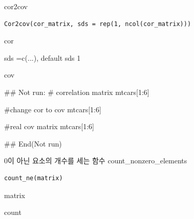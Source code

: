 \documentclass[a4paper]{book}
\begin{document}
%
\begin{Description}
cor2cov
\end{Description}
%
\begin{Usage}
\begin{verbatim}
Cor2cov(cor_matrix, sds = rep(1, ncol(cor_matrix)))
\end{verbatim}
\end{Usage}
%
\begin{Arguments}
\begin{ldescription}
\item[\code{cor\_matrix}] cor

\item[\code{sds}] sds =c(...), default sds 1
\end{ldescription}
\end{Arguments}
%
\begin{Value}
cov
\end{Value}
%
\begin{Examples}
\begin{ExampleCode}

## Not run: 
# correlation matrix
mtcars[1:6] %

#change cor to cov
mtcars[1:6] %

#real cov matrix
mtcars[1:6] %


## End(Not run)


\end{ExampleCode}
\end{Examples}
%
\begin{Description}
0이 아닌 요소의 개수를 세는 함수 count\_nonzero\_elements
\end{Description}
%
\begin{Usage}
\begin{verbatim}
count_ne(matrix)
\end{verbatim}
\end{Usage}
%
\begin{Arguments}
\begin{ldescription}
\item[\code{matrix}] matrix
\end{ldescription}
\end{Arguments}
%
\begin{Value}
count
\end{Value}
%
\end{document}
